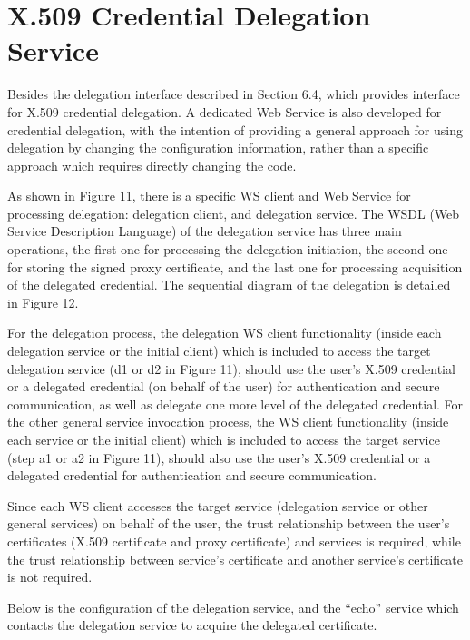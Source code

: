 \documentclass{article}                            %
\begin{document}


\section{X.509 Credential Delegation Service} %
\label{sec:delegation_service}
Besides the delegation interface described in Section 6.4, which provides interface for X.509 credential delegation. A dedicated Web Service is also developed for credential delegation, with the intention of providing a general approach for using delegation by changing the configuration information, rather than a specific approach which requires directly changing the code.

    As shown in Figure 11, there is a specific WS client and Web Service for processing delegation: delegation client, and delegation service. The WSDL (Web Service Description Language) of the delegation service has three main operations, the first one for processing the delegation initiation, the second one for storing the signed proxy certificate, and the last one for processing acquisition of the delegated credential. The sequential diagram of the delegation is detailed in Figure 12.

    For the delegation process, the delegation WS client functionality (inside each delegation service or the initial client) which is included to access the target delegation service (d1 or d2 in Figure 11), should use the user’s X.509 credential or a delegated credential (on behalf of the user) for authentication and secure communication, as well as delegate one more level of the delegated credential. For the other general  service invocation process, the WS client functionality (inside each service or the initial client) which is included to access the target service (step a1 or a2 in Figure 11), should also use the user’s X.509 credential or a delegated credential for authentication and secure communication.

    Since each WS client accesses the target service (delegation service or other general services) on behalf of the user, the trust relationship between the user’s certificates (X.509 certificate and proxy certificate) and services is required, while the trust relationship between service’s certificate and another service’s certificate is not required.

Below is the configuration of the delegation service, and the ``echo'' service which contacts the delegation service to acquire the delegated certificate.
\end{document}
